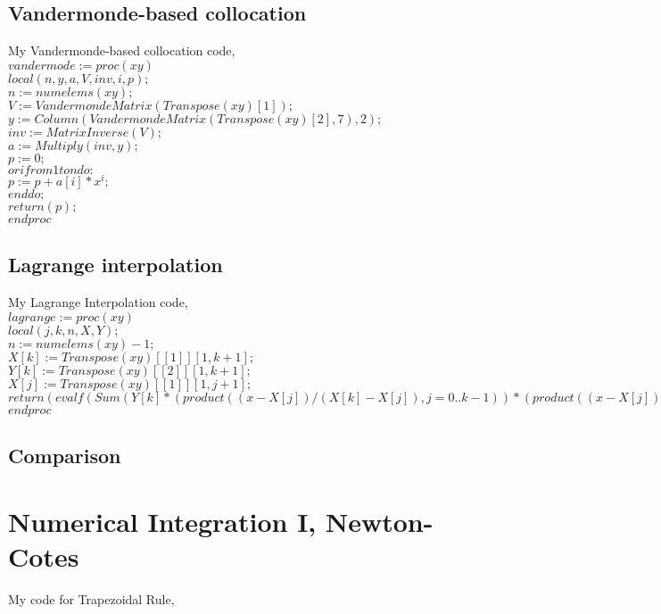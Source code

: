\documentclass[12pt]{article}
\begin{document}
\subsection{Vandermonde-based collocation}
My Vandermonde-based collocation code,\\

$vandermode:=proc(xy)$\\
$local(n, y, a, V, inv, i, p);$\\
$n := numelems(xy);$\\
$V := VandermondeMatrix(Transpose(xy)[1]);$\\
$y := Column(VandermondeMatrix(Transpose(xy)[2], 7), 2);$\\
$inv := MatrixInverse(V);$\\
$a := Multiply(inv, y);$\\
$p := 0;$\\
$or i from 1to n do:$\\
$p := p+a[i]*x^i;$\\
$end do;$\\
$return( p);$\\
$end proc$\\

\subsection{Lagrange interpolation}
My Lagrange Interpolation code,\\

$lagrange:=proc(xy)$\\
$local(j, k, n, X, Y);$\\
$n := numelems(xy)-1;$\\
$X[k] := Transpose(xy)[[1]][1, k+1];$\\
$Y[k] := Transpose(xy)[[2]][1, k+1];$\\
$X[j] := Transpose(xy)[[1]][1, j+1];$\\
$return(evalf(Sum(Y[k]*(product((x-X[j])/(X[k]-X[j]), j = 0 .. k-1))*(product((x-X[j])/(X[k]-X[j]), j = k+1 .. n)), k = 0 .. n)));$\\
$end proc$\\
\clearpage
\subsection{Comparison}
\clearpage
\setcounter{section}{8}
\section{Numerical Integration I, Newton-Cotes}
My code for Trapezoidal Rule,\\
\end{document}
